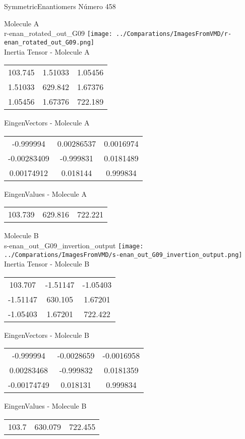 \vtab[-2cm]
\begin{center}
{\large SymmetricEnantiomers \tab Número 458}
\end{center}
\begin{multicols}{2}
\begin{center}

Molecule A \\ 
r-enan\_rotated\_out\_G09
\texttt{[image: ../Comparations/ImagesFromVMD/r-enan\_rotated\_out\_G09.png]}
\\
Inertia Tensor - Molecule A \\
\vtab

\begin{tabular}{|c c c|}
103.745	 & 	1.51033	 & 	1.05456	 \\
1.51033	 & 	629.842	 & 	1.67376	 \\
1.05456	 & 	1.67376	 & 	722.189
\end{tabular}

\vtab
 EingenVectors - Molecule A     \\
\vtab
\begin{tabular}{|c c c|}
-0.999994	 & 	0.00286537	 & 	0.0016974	 \\
-0.00283409	 & 	-0.999831	 & 	0.0181489	 \\
0.00174912	 & 	0.018144	 & 	0.999834
\end{tabular}

\vtab
 EingenValues - Molecule A     \\
\vtab
\begin{tabular}{|c c c|}
103.739	 & 	629.816	 & 	722.221	 \\
\end{tabular}
\columnbreak

Molecule B \\ 
s-enan\_out\_G09\_invertion\_output
\texttt{[image: ../Comparations/ImagesFromVMD/s-enan\_out\_G09\_invertion\_output.png]}
\\
Inertia Tensor - Molecule B \\
\vtab

\begin{tabular}{|c c c|}
103.707	 & 	-1.51147	 & 	-1.05403	 \\
-1.51147	 & 	630.105	 & 	1.67201	 \\
-1.05403	 & 	1.67201	 & 	722.422
\end{tabular}

\vtab
 EingenVectors - Molecule B     \\
\vtab
\begin{tabular}{|c c c|}
-0.999994	 & 	-0.0028659	 & 	-0.0016958	 \\
0.00283468	 & 	-0.999832	 & 	0.0181359	 \\
-0.00174749	 & 	0.018131	 & 	0.999834
\end{tabular}

\vtab
 EingenValues - Molecule B     \\
\vtab
\begin{tabular}{|c c c|}
103.7	 & 	630.079	 & 	722.455	 \\
\end{tabular}

\end{center}
\end{multicols}
